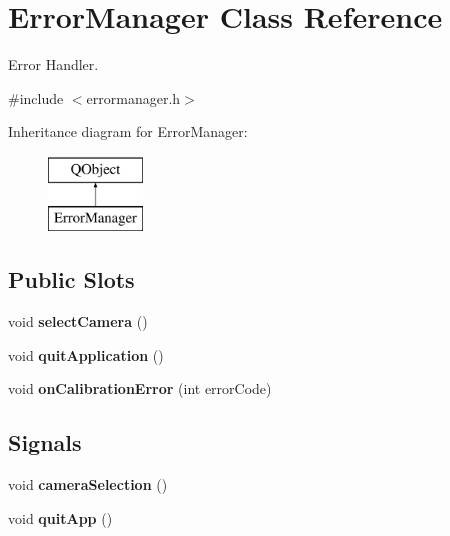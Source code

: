 \hypertarget{classErrorManager}{}\section{Error\+Manager Class Reference}
\label{classErrorManager}


Error Handler.  




{\ttfamily \#include $<$errormanager.\+h$>$}

Inheritance diagram for Error\+Manager\+:\begin{figure}[H]
\begin{center}
\leavevmode
\includegraphics[height=2.000000cm]{classErrorManager}
\end{center}
\end{figure}
\subsection*{Public Slots}
\begin{DoxyCompactItemize}
\item 
\hypertarget{classErrorManager_ae40cde62f5da1b12f94d36e9934e0e55}{}void {\bfseries select\+Camera} ()\label{classErrorManager_ae40cde62f5da1b12f94d36e9934e0e55}

\item 
\hypertarget{classErrorManager_ab570a754d257754679cb9fd0f275f5d5}{}void {\bfseries quit\+Application} ()\label{classErrorManager_ab570a754d257754679cb9fd0f275f5d5}

\item 
\hypertarget{classErrorManager_a2415d61789380707a9cc250ec7724d11}{}void {\bfseries on\+Calibration\+Error} (int error\+Code)\label{classErrorManager_a2415d61789380707a9cc250ec7724d11}

\end{DoxyCompactItemize}
\subsection*{Signals}
\begin{DoxyCompactItemize}
\item 
\hypertarget{classErrorManager_a359b6512ce87b4ee00714a08f441efe1}{}void {\bfseries camera\+Selection} ()\label{classErrorManager_a359b6512ce87b4ee00714a08f441efe1}

\item 
\hypertarget{classErrorManager_a60bf6a3ba2c2df771eded13e679abe09}{}void {\bfseries quit\+App} ()\label{classErrorManager_a60bf6a3ba2c2df771eded13e679abe09}

\end{DoxyCompactItemize}
